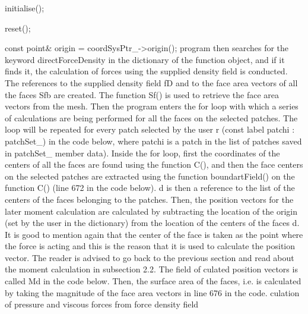  {
 initialise();

 reset();

 const point\& origin = coordSysPtr\_->origin();
 program then searches for the keyword directForceDensity in the dictionary of the function object, and if it finds it, the calculation of forces using the supplied density field is conducted. The references to the supplied density field fD and to the face area vectors of all the faces Sfb are created. The function Sf() is used to retrieve the face area vectors from the mesh. Then the program enters the for loop with which a series of calculations are being performed for all the faces on the selected patches. The loop will be repeated for every patch selected by the user
r (const label patchi : patchSet\_) in the code below, where patchi is a patch in the list of patches saved in patchSet\_ member data). Inside the for loop, first the coordinates of the  centers of all the faces are found using the function C(), and then the face centers on the selected patches are extracted using the function boundartField() on the function C() (line 672 in the code below). d is then a reference to the list of the centers of the faces belonging to the patches. Then, the position vectors for the later moment calculation are calculated by subtracting the location of the origin (set by the user in the dictionary) from the location of the centers of the faces d. It is good to mention again that the center of the face is taken as the point where the force is acting and this is the reason that it is used to calculate the position vector. The reader is advised to go back to the previous section and read about the moment calculation in subsection 2.2. The field of
culated position vectors is called Md in the code below. Then, the surface area of the faces, i.e.
 is calculated by taking the magnitude of the face area vectors in line 676 in the code.
culation of pressure and viscous forces from force density field
%
%
%
%
%
%
%

}
